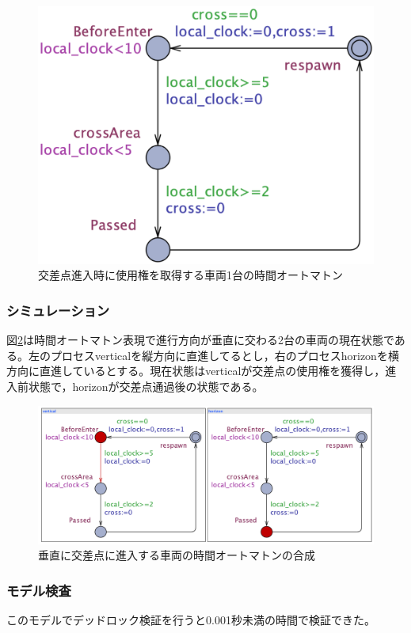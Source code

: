 \documentclass{tpu-sotu}
\begin{document}
	\begin{figure}[htbp]
	\centering
	\includegraphics[width=125mm]{Perpendicular.png}
	\caption{交差点進入時に使用権を取得する車両1台の時間オートマトン}
	\label{Perpendicular}
	\end{figure}
	
	\subsubsection{シミュレーション}
	
	図\ref{PerpendicularS}は時間オートマトン表現で進行方向が垂直に交わる2台の車両の現在状態である。左のプロセスverticalを縦方向に直進してるとし，右のプロセスhorizonを横方向に直進しているとする。現在状態はverticalが交差点の使用権を獲得し，進入前状態で，horizonが交差点通過後の状態である。
	\begin{figure}[htbp]
	\centering
	\includegraphics[width=130mm]{PerpendicularSimu.png}
	\caption{垂直に交差点に進入する車両の時間オートマトンの合成}
	\label{PerpendicularS}
	\end{figure}
	
	\subsubsection{モデル検査}
	このモデルでデッドロック検証を行うと0.001秒未満の時間で検証できた。
\end{document}
